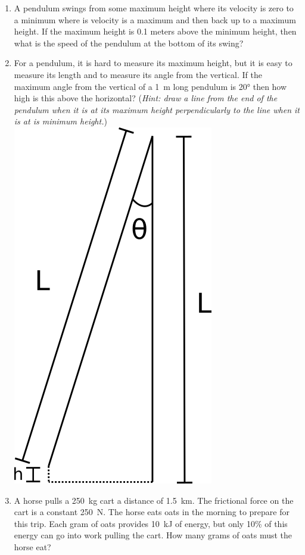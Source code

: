 \begin{enumerate}
\item 
A pendulum swings from some maximum height where its velocity is zero to a minimum where is velocity is a maximum and then back up to a maximum height. If the maximum height is 0.1 meters above the minimum height, then what is the speed of the pendulum at the bottom of its swing?

\item 
For a pendulum, it is hard to measure its maximum height, but it is easy to measure its length and to measure its angle from the vertical. If the maximum angle from the vertical of a \SI{1}{\meter} long pendulum is \ang{20} then how high is this above the horizontal? (\emph{Hint: draw a line from the end of the pendulum when it is at its maximum height perpendicularly to the line when it is at is minimum height.})\\ 

\includegraphics[]{pendulum-h-l-theta.png} 

\item 
A horse pulls a \SI{250}{kg} cart a distance of \SI{1.5}{km}. The frictional force on the cart is a constant \SI{250}{\newton}. The horse eats oats in the morning to prepare for this trip. Each gram of oats provides \SI{10}{\kilo\joule} of energy, but only 10\% of this energy can go into work pulling the cart. How many grams of oats must the horse eat?


\end{enumerate}
